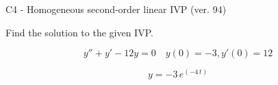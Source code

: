 \begin{exercise}
  \begin{exerciseTitle}C4 - Homogeneous second-order linear IVP (ver. 94)\end{exerciseTitle}
  \begin{exerciseStatement}
    
Find the solution to the given IVP.

    
\[y''+y'-12y = 0 \hspace{1em} y(0) = -3 , y'(0) = 12\]

  \end{exerciseStatement}
  \begin{exerciseAnswer}
    
\[y= -3 \, e^{\left(-4 \, t\right)}\]

  \end{exerciseAnswer}
\end{exercise}